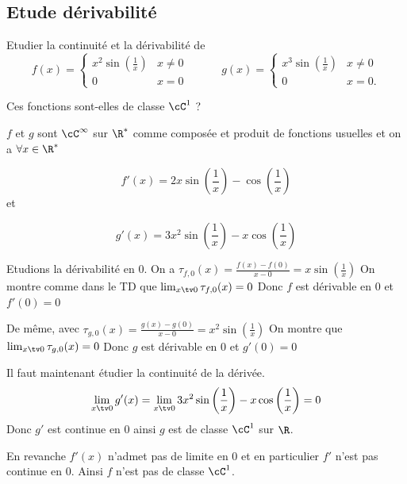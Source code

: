 
\subsection{Etude dérivabilité }

\begin{exercice}   \;
Etudier la continuité et la dérivabilité de 
$$f(x)=\left\{\begin{array}{ll}
x^2\sin\left(\frac 1x\right)&x\neq 0\\
0&x=0
\end{array}\right.\quad\quad\quad
g(x)=\left\{\begin{array}{ll}
x^3\sin\left(\frac 1x\right)&x\neq 0\\
0&x=0.
\end{array}\right.$$

Ces fonctions sont-elles de classe $\cC^1$ ? 
\end{exercice}

\begin{correction}

$f$ et $g$ sont $\cC^\infty$ sur $\R^*$ comme composée et produit de fonctions usuelles et on a $\forall x\in \R^*$

$$f'(x) = 2x \sin\left(\frac 1x\right) -\cos\left(\frac 1x\right)$$
et 

$$g'(x) = 3x^2 \sin\left(\frac 1x\right) -x\cos\left(\frac 1x\right)$$


Etudions la dérivabilité en $0$. 
On  a $\tau_{f,0} (x)=\frac{f(x)-f(0)}{x-0}= x\sin\left(\frac 1x\right)$ 
On montre comme dans le TD que $\lim_{x\tv0}\tau_{f,0} (x) =0$
Donc $f$ est dérivable en $0$ et $f'(0)=0$

De même, avec 
$\tau_{g,0} (x)=\frac{g(x)-g(0)}{x-0}= x^2\sin\left(\frac 1x\right)$ 
On montre que $\lim_{x\tv0}\tau_{g,0} (x) =0$
Donc $g$ est dérivable en $0$ et $g'(0)=0$


Il faut maintenant étudier la continuité de  la dérivée. 
$$\lim_{x\tv 0} g'(x) = \lim_{x\tv 0}  3x^2 \sin\left(\frac 1x\right) -x\cos\left(\frac 1x\right) = 0$$
Donc $g'$ est continue en $0$  ainsi $g$ est de classe $\cC^1$ sur $\R$. 

En revanche $f'(x) $ n'admet pas de limite en $0$ et en particulier $f'$ n'est pas continue en $0$. Ainsi $f$ n'est  pas de classe $\cC^1$. 

\end{correction}






